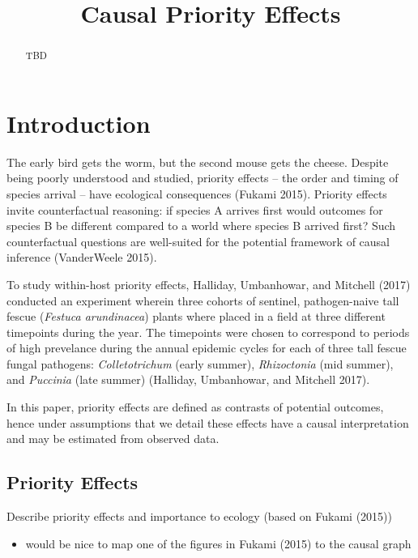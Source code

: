 \documentclass[]{article}
\title{Causal Priority Effects}
\author{}
\date{}
\providecommand{\tightlist}{%
  \setlength{\itemsep}{0pt}\setlength{\parskip}{0pt}}
\begin{document}
\maketitle
\begin{abstract}
TBD
\end{abstract}

\hypertarget{introduction}{%
\section{Introduction}\label{introduction}}

The early bird gets the worm, but the second mouse gets the cheese.
Despite being poorly understood and studied, priority effects -- the
order and timing of species arrival -- have ecological consequences
(Fukami 2015). Priority effects invite counterfactual reasoning: if
species A arrives first would outcomes for species B be different
compared to a world where species B arrived first? Such counterfactual
questions are well-suited for the potential framework of causal
inference (VanderWeele 2015).

To study within-host priority effects, Halliday, Umbanhowar, and
Mitchell (2017) conducted an experiment wherein three cohorts of
sentinel, pathogen-naive tall fescue (\emph{Festuca arundinacea}) plants
where placed in a field at three different timepoints during the year.
The timepoints were chosen to correspond to periods of high prevelance
during the annual epidemic cycles for each of three tall fescue fungal
pathogens: \emph{Colletotrichum} (early summer), \emph{Rhizoctonia} (mid
summer), and \emph{Puccinia} (late summer) (Halliday, Umbanhowar, and
Mitchell 2017).

In this paper, priority effects are defined as contrasts of potential
outcomes, hence under assumptions that we detail these effects have a
causal interpretation and may be estimated from observed data.

\hypertarget{priority-effects}{%
\subsection{Priority Effects}\label{priority-effects}}

Describe priority effects and importance to ecology (based on Fukami
(2015))

\begin{itemize}
\tightlist
\item
  would be nice to map one of the figures in Fukami (2015) to the causal
  graph
\end{itemize}
\end{document}
